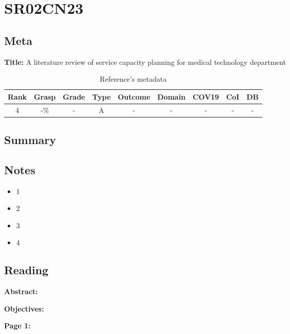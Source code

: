 \section{ SR02CN23 }


\subsection{Meta}

    \textbf{Title:}
    A literature review of service capacity planning for medical technology department

    \begin{table}[H]
        \centering
        \begin{tabular}{|c|c|c|c|c|c|c|c|c|}
            \hline
                \textbf{Rank} & \textbf{Grasp} & \textbf{Grade} & \textbf{Type} & \textbf{Outcome} & \textbf{Domain} & \textbf{COV19} & \textbf{CoI} & \textbf{DB} \\
            \hline
                4 & -\% & - & A & - & - & - & - & - \\
            \hline
        \end{tabular}
        \caption{Reference's metadata}
        \label{tab:SR02CN23}
    \end{table}

\subsection{Summary}
    \cite{x243}

\subsection{Notes}
    \begin{itemize}
        \item 1
        \item 2
        \item 3
        \item 4
    \end{itemize}


\subsection{Reading}
    \textbf{Abstract:}

    
    \textbf{Objectives:}

    
    \textbf{Page 1:}
    
